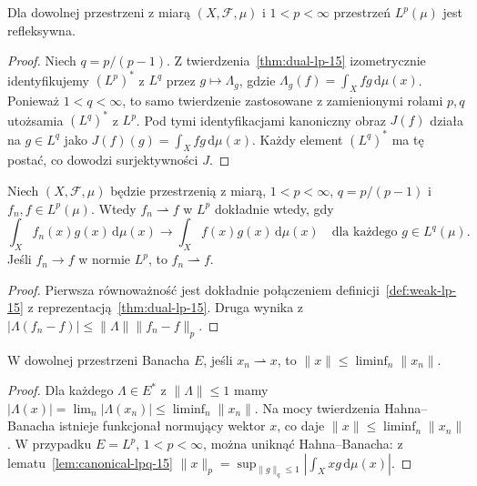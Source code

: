 \begin{twierdzenie}[Refleksywność $L^p$]
\label{thm:reflexive-lp-15}
Dla dowolnej przestrzeni z miarą $(X,\mathcal F,\mu)$
i $1<p<\infty$ przestrzeń $L^p(\mu)$ jest refleksywna.
\end{twierdzenie}
\begin{proof}
Niech $q=p/(p-1)$. Z twierdzenia~\ref{thm:dual-lp-15}
izometrycznie identyfikujemy $(L^p)^*$ z $L^q$ przez
$g\mapsto\Lambda_g$, gdzie $\Lambda_g(f)=\int_Xfg\,\mathrm d\mu(x)$.
Ponieważ $1<q<\infty$, to samo twierdzenie zastosowane
z zamienionymi rolami $p,q$ utożsamia $(L^q)^*$ z $L^p$.
Pod tymi identyfikacjami kanoniczny obraz $J(f)$
działa na $g\in L^q$ jako $J(f)(g)=\int_Xfg\,\mathrm d\mu(x)$.
Każdy element $(L^q)^*$ ma tę postać, co dowodzi
surjektywności $J$.
\end{proof}

\begin{twierdzenie}
\label{thm:weak-lp-15}
Niech $(X,\mathcal F,\mu)$ będzie przestrzenią z miarą,
$1<p<\infty$, $q=p/(p-1)$ i $f_n,f\in L^p(\mu)$.
Wtedy $f_n\rightharpoonup f$ w $L^p$ dokładnie wtedy, gdy
\[
\int_Xf_n(x)g(x)\,\mathrm d\mu(x)
\longrightarrow\int_Xf(x)g(x)\,\mathrm d\mu(x)
\quad\text{dla każdego }g\in L^q(\mu).
\]
Jeśli $f_n\to f$ w normie $L^p$, to $f_n\rightharpoonup f$.
\end{twierdzenie}
\begin{proof}
Pierwsza równoważność jest dokładnie połączeniem
definicji~\ref{def:weak-lp-15} z
reprezentacją~\ref{thm:dual-lp-15}.
Druga wynika z $|\Lambda(f_n-f)|\le\|\Lambda\|\|f_n-f\|_p$.
\end{proof}

\begin{twierdzenie}
\label{thm:weak-lsc-15}
W dowolnej przestrzeni Banacha $E$, jeśli $x_n\rightharpoonup x$,
to $\|x\|\le\liminf_n\|x_n\|$.
\end{twierdzenie}
\begin{proof}
Dla każdego $\Lambda\in E^*$ z $\|\Lambda\|\le1$
mamy $|\Lambda(x)|=\lim_n|\Lambda(x_n)|
\le\liminf_n\|x_n\|$.
Na mocy twierdzenia Hahna--Banacha istnieje
funkcjonał normujący wektor $x$, co daje
$\|x\|\le\liminf_n\|x_n\|$.
W przypadku $E=L^p$, $1<p<\infty$, można uniknąć
Hahna--Banacha: z lematu~\ref{lem:canonical-lpq-15}
$\|x\|_p=\sup_{\|g\|_q\le1}|\int_Xxg\,\mathrm d\mu(x)|$.
\end{proof}

